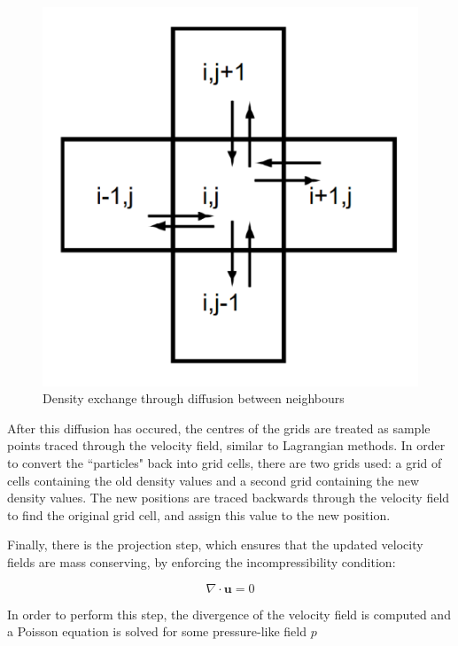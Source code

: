\documentclass[12pt]{article}
\begin{document}
    \begin{figure}[H]
        \begin{center}
            \includegraphics{neighbourDiff.png}
            \caption{Density exchange through diffusion between neighbours \cite{stam}}
        \end{center}   
    \end{figure}

    After this diffusion has occured, the centres of the grids are treated as sample points traced through the velocity field, similar to Lagrangian methods. In order to convert the ``particles" back into grid cells, there are two grids used: a grid of cells containing the old density values and a second grid containing the new density values. The new positions are traced backwards through the velocity field to find the original grid cell, and assign this value to the new position.

    Finally, there is the projection step, which ensures that the updated velocity fields are mass conserving, by enforcing the incompressibility condition: 
    
    \begin{equation}
        \nabla \cdot \textbf{u} = 0
    \end{equation}
    
    In order to perform this step, the divergence of the velocity field is computed and a Poisson equation is solved for some pressure-like field $p$
    
\end{document}
